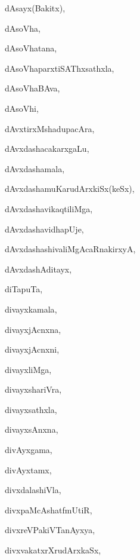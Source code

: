 \begin{multicols}{3}
{\noindent
{dAsayx(Bakitx)}, \pageref{dAsayxBakitx}

\noindent
{dAsoVha}, \pageref{dAsoVha}

\noindent
{dAsoVhatana}, \pageref{dAsoVhatana}

\noindent
{dAsoVhaparxtiSAThxsathxla}, \pageref{dAsoVhaparxtiSAThxsathxla}

\noindent
{dAsoVhaBAva}, \pageref{dAsoVhaBAva}

\noindent
{dAsoVhi}, \pageref{dAsoVhi}

\noindent
{dAvxtirxMshadupacAra}, \pageref{dAvxtirxMshadupacAra}

\noindent
{dAvxdashacakarx\-gaLu}, \pageref{dAvxdashacakarxgaLu}

\noindent
{dAvxdashamala}, \pageref{dAvxdashamala}

\noindent
{dAvxdashamuKarudArxkiSx(keSx)}, \pageref{dAvxdashamuKarudArxkiSxkeSx}

\noindent
{dAvxdashavikaqtiliMga}, \pageref{dAvxdashavikaqtiliMga}

\noindent
{dAvxdashavidhapUje}, \pageref{dAvxdashavidhapUje}

\noindent
{dAvxdashashivaliMgAcaRnakirxyA}, \pageref{dAvxdashashivaliMgAcaRnakirxyA}

\noindent
{dAvxdashAditayx}, \pageref{dAvxdashAditayx}

\noindent
{diTapuTa}, \pageref{diTapuTa}

\noindent
{divayxkamala}, \pageref{divayxkamala}

\noindent
{divayxjAcnxna}, \pageref{divayxjAcnxna}

\noindent
{divayxjAcnxni}, \pageref{divayxjAcnxni}

\noindent
{divayxliMga}, \pageref{divayxliMga}

\noindent
{divayxshariVra}, \pageref{divayxshariVra}

\noindent
{divayxsathxla}, \pageref{divayxsathxla}

\noindent
{divayxsAnxna}, \pageref{divayxsAnxna}

\noindent
{divAyxgama}, \pageref{divAyxgama}

\noindent
{divAyxtamx}, \pageref{divAyxtamx}

\noindent
{divxdalashiVla}, \pageref{divxdalashiVla}

\noindent
{divxpaMcAshatfmUtiR}, \pageref{divxpaMcAshatfmUtiR}

\noindent
{divxreVPakiVTanAyxya}, \pageref{divxreVPakiVTanAyxya}

\noindent
{divxvakatxrXrudArxkaSx}, \pageref{divxvakatxrXrudArxkaSx}

}
\end{multicols}
